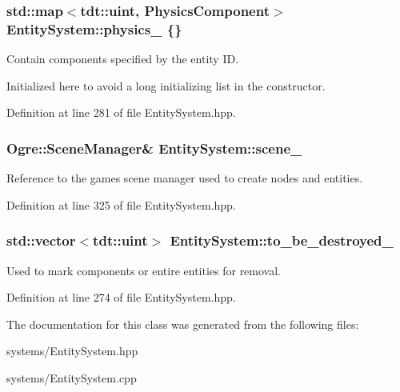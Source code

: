\subsubsection[{\texorpdfstring{physics\+\_\+}{physics_}}]{\setlength{\rightskip}{0pt plus 5cm}std\+::map$<$tdt\+::uint, {\bf Physics\+Component}$>$ Entity\+System\+::physics\+\_\+ \{\}\hspace{0.3cm}{\ttfamily [private]}}\hypertarget{class_entity_system_a6d0a97449d5346dbc389abbedccf06f8}{}\label{class_entity_system_a6d0a97449d5346dbc389abbedccf06f8}


Contain components specified by the entity ID. 

Initialized here to avoid a long initializing list in the constructor. 

Definition at line 281 of file Entity\+System.\+hpp.

\subsubsection[{\texorpdfstring{scene\+\_\+}{scene_}}]{\setlength{\rightskip}{0pt plus 5cm}Ogre\+::\+Scene\+Manager\& Entity\+System\+::scene\+\_\+\hspace{0.3cm}{\ttfamily [private]}}\hypertarget{class_entity_system_a50f05baee9a67a5a7c5828b4eaf57bb4}{}\label{class_entity_system_a50f05baee9a67a5a7c5828b4eaf57bb4}


Reference to the game\textquotesingle{}s scene manager used to create nodes and entities. 



Definition at line 325 of file Entity\+System.\+hpp.

\subsubsection[{\texorpdfstring{to\+\_\+be\+\_\+destroyed\+\_\+}{to_be_destroyed_}}]{\setlength{\rightskip}{0pt plus 5cm}std\+::vector$<$tdt\+::uint$>$ Entity\+System\+::to\+\_\+be\+\_\+destroyed\+\_\+\hspace{0.3cm}{\ttfamily [private]}}\hypertarget{class_entity_system_a3b18dc742fb036c9fae1836136b3e115}{}\label{class_entity_system_a3b18dc742fb036c9fae1836136b3e115}


Used to mark components or entire entities for removal. 



Definition at line 274 of file Entity\+System.\+hpp.



The documentation for this class was generated from the following files\+:\begin{DoxyCompactItemize}
\item 
systems/Entity\+System.\+hpp\item 
systems/Entity\+System.\+cpp\end{DoxyCompactItemize}
